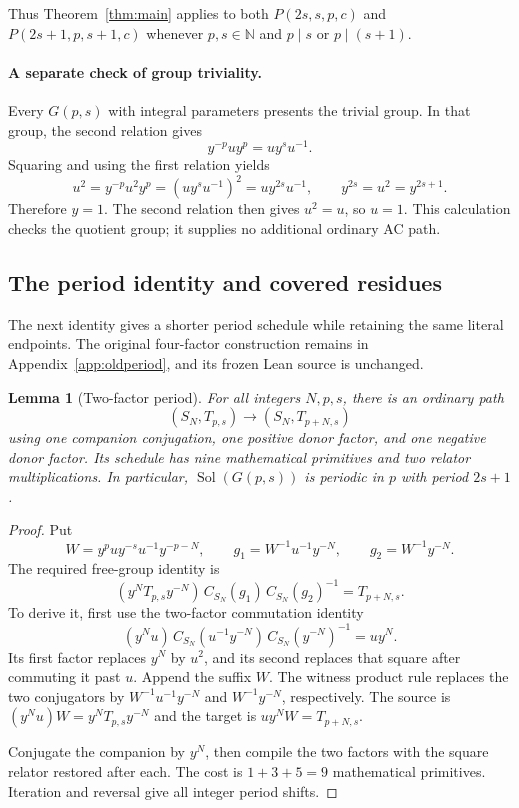 \documentclass[11pt]{article}
\newtheorem{lemma}[theorem]{Lemma}
\theoremstyle{definition}\newtheorem{definition}[theorem]{Definition}
\theoremstyle{remark}\newtheorem{remark}[theorem]{Remark}
\newcommand{\Sol}{\operatorname{Sol}}
\begin{document}
Thus Theorem~\ref{thm:main} applies to both $P(2s,s,p,c)$ and $P(2s+1,p,s+1,c)$ whenever $p,s\in\mathbb N$ and $p\mid s$ or $p\mid(s+1)$.

\paragraph{A separate check of group triviality.}
Every $G(p,s)$ with integral parameters presents the trivial group. In that group, the second relation gives
\[
y^{-p}uy^p=uy^su^{-1}.
\]
Squaring and using the first relation yields
\[
u^2=y^{-p}u^2y^p=(uy^su^{-1})^2=uy^{2s}u^{-1},
\qquad y^{2s}=u^2=y^{2s+1}.
\]
Therefore $y=1$. The second relation then gives $u^2=u$, so $u=1$. This calculation checks the quotient group; it supplies no additional ordinary AC path.

\subsection{The period identity and covered residues}
The next identity gives a shorter period schedule while retaining the same literal endpoints. The original four-factor construction remains in Appendix~\ref{app:oldperiod}, and its frozen Lean source is unchanged.

\begin{lemma}[Two-factor period]\label{lem:period}
For all integers $N,p,s$, there is an ordinary path
\[
(S_N,T_{p,s})\longrightarrow(S_N,T_{p+N,s})
\]
using one companion conjugation, one positive donor factor, and one negative donor factor. Its schedule has nine mathematical primitives and two relator multiplications. In particular, $\Sol(G(p,s))$ is periodic in $p$ with period $2s+1$.
\end{lemma}
\begin{proof}
Put
\[
W=y^puy^{-s}u^{-1}y^{-p-N},\qquad
 g_1=W^{-1}u^{-1}y^{-N},\qquad g_2=W^{-1}y^{-N}.
\]
The required free-group identity is
\begin{equation}\label{eq:period}
(y^NT_{p,s}y^{-N})\,C_{S_N}(g_1)\,C_{S_N}(g_2)^{-1}=T_{p+N,s}.
\end{equation}
To derive it, first use the two-factor commutation identity
\[
(y^Nu)\,C_{S_N}(u^{-1}y^{-N})\,C_{S_N}(y^{-N})^{-1}=uy^N.
\]
Its first factor replaces $y^N$ by $u^2$, and its second replaces that square after commuting it past $u$. Append the suffix $W$. The witness product rule replaces the two conjugators by $W^{-1}u^{-1}y^{-N}$ and $W^{-1}y^{-N}$, respectively. The source is $(y^Nu)W=y^NT_{p,s}y^{-N}$ and the target is $uy^NW=T_{p+N,s}$.

Conjugate the companion by $y^N$, then compile the two factors with the square relator restored after each. The cost is $1+3+5=9$ mathematical primitives. Iteration and reversal give all integer period shifts.
\end{proof}
\end{document}
